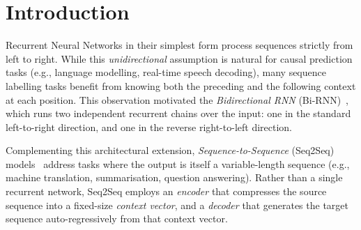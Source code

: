 \documentclass[12pt,a4paper]{article}
\begin{document}
\begin{abstract}
Session 23 of the deep learning course covered three interconnected topics.
The session opened with the \emph{Bidirectional Recurrent Neural Network}
(Bi-RNN) architecture: two independent RNN (or LSTM/GRU) chains process the
input sequence in opposite directions, and each output position concatenates
the forward and backward hidden states, giving the network full past-and-future
context.  A recap of ``When Data is Sequential'' provided the RNN/LSTM/GRU
motivation within the Seq2Seq framing.  The stacked Seq2Seq architecture was
then detailed: multiple LSTM layers in both encoder and decoder increase model
capacity, with embedding layers at the input converting token IDs to dense
vectors.  The session concluded with a hands-on Google Colab walkthrough of an
English-to-Hindi machine translation pipeline --- covering tokenisation,
vocabulary construction, padding, teacher forcing, and the \texttt{Encoder}
class with a sanity check on output tensor shapes.
\end{abstract}

\newpage

\newpage

\section{Introduction}
\label{sec:introduction}

Recurrent Neural Networks in their simplest form process sequences strictly
from left to right.  While this \emph{unidirectional} assumption is natural for
causal prediction tasks (e.g., language modelling, real-time speech decoding),
many sequence labelling tasks benefit from knowing both the preceding and the
following context at each position.  This observation motivated the
\emph{Bidirectional RNN} (Bi-RNN)~\cite{schuster1997bidirectional}, which runs
two independent recurrent chains over the input: one in the standard
left-to-right direction, and one in the reverse right-to-left direction.

Complementing this architectural extension, \emph{Sequence-to-Sequence} (Seq2Seq)
models~\cite{sutskever2014sequence} address tasks where the output is itself a
variable-length sequence (e.g., machine translation, summarisation, question
answering).  Rather than a single recurrent network, Seq2Seq employs an
\emph{encoder} that compresses the source sequence into a fixed-size
\emph{context vector}, and a \emph{decoder} that generates the target sequence
auto-regressively from that context vector.
\end{document}
